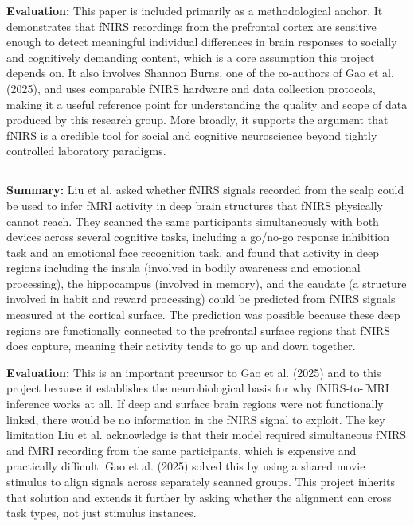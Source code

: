 \documentclass[12pt]{article}
\begin{document}
\textbf{Evaluation:} This paper is included primarily as a methodological anchor. It demonstrates that fNIRS recordings from the prefrontal cortex are sensitive enough to detect meaningful individual differences in brain responses to socially and cognitively demanding content, which is a core assumption this project depends on. It also involves Shannon Burns, one of the co-authors of Gao et al. (2025), and uses comparable fNIRS hardware and data collection protocols, making it a useful reference point for understanding the quality and scope of data produced by this research group. More broadly, it supports the argument that fNIRS is a credible tool for social and cognitive neuroscience beyond tightly controlled laboratory paradigms.

\subsection*{\cite{liu2015}}
\textbf{Summary:} Liu et al. asked whether fNIRS signals recorded from the scalp could be used to infer fMRI activity in deep brain structures that fNIRS physically cannot reach. They scanned the same participants simultaneously with both devices across several cognitive tasks, including a go/no-go response inhibition task and an emotional face recognition task, and found that activity in deep regions including the insula (involved in bodily awareness and emotional processing), the hippocampus (involved in memory), and the caudate (a structure involved in habit and reward processing) could be predicted from fNIRS signals measured at the cortical surface. The prediction was possible because these deep regions are functionally connected to the prefrontal surface regions that fNIRS does capture, meaning their activity tends to go up and down together.

\textbf{Evaluation:} This is an important precursor to Gao et al. (2025) and to this project because it establishes the neurobiological basis for why fNIRS-to-fMRI inference works at all. If deep and surface brain regions were not functionally linked, there would be no information in the fNIRS signal to exploit. The key limitation Liu et al. acknowledge is that their model required simultaneous fNIRS and fMRI recording from the same participants, which is expensive and practically difficult. Gao et al. (2025) solved this by using a shared movie stimulus to align signals across separately scanned groups. This project inherits that solution and extends it further by asking whether the alignment can cross task types, not just stimulus instances.
\end{document}
